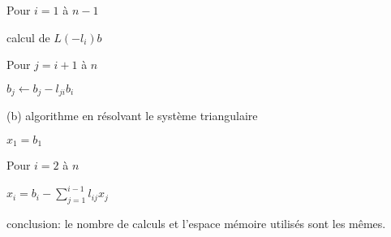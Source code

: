 {\begin{enumerate}
{Pour $i=1$ \`a $n-1$

\hspace{2cm} calcul de $L(-l_i)b$

\hspace{3cm} Pour $j=i+1$ \`a $n$

\hspace{4cm} $b_j\leftarrow b_j-l_{ji}b_i$


(b) algorithme en r\'esolvant le syst\`eme triangulaire

$x_1 =b_1$

Pour $i=2$ \`a $n$ 

\hspace{2cm}$x_i=b_i-\sum_{j=1}^{i-1}l_{ij}x_j$


conclusion: le nombre de calculs et l'espace m\'emoire utilis\'es sont les m\^emes.
}
\end{enumerate}
}
